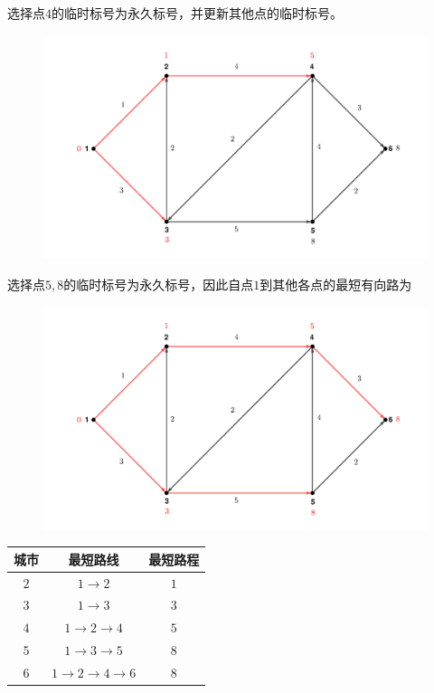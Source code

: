 \documentclass[lang = cn, scheme = chinese, thmcnt = section]{elegantbook}
\begin{document}
\begin{solution}
	选择点$4$​的临时标号为永久标号，并更新其他点的临时标号。
	\begin{figure}[H]
		\centering
		\includegraphics[scale = 0.15]{../图/13.1.5}
	\end{figure}
	
	选择点$5,8$的临时标号为永久标号，因此自点$1$到其他各点的最短有向路为
	\begin{figure}[H]
		\centering
		\includegraphics[scale = 0.15]{../图/13.1.6}
	\end{figure}
	\begin{table}[H]
		\centering
		\begin{tabular}{ccc}
			\toprule
			\textbf{城市} & \textbf{最短路线} & \textbf{最短路程} \\
			\midrule
			$2$ & $1\to 2$ & $1$ \\
			$3$ & $1\to 3$ & $3$ \\
			$4$ & $1\to 2\to 4$ & $5$ \\
			$5$ & $1\to 3\to 5$ & $8$ \\
			$6$ & $1\to 2\to 4\to 6$ & $8$ \\
			\bottomrule
		\end{tabular}
	\end{table}
\end{solution}
\end{document}

